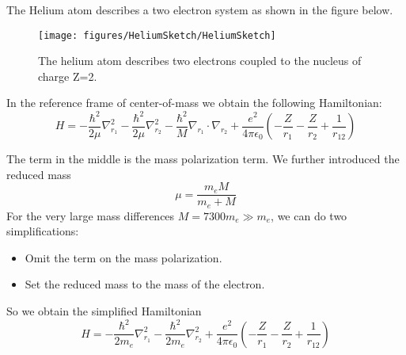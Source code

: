 \documentclass[10pt]{article}
\begin{document}
The Helium atom describes a two electron system as shown in the figure below.
\begin{figure}[h!]
\begin{center}
\texttt{[image: figures/HeliumSketch/HeliumSketch]}
\caption{{The helium atom describes two electrons coupled to the nucleus of charge
Z=2.~~
{\label{982117}}%
}}
\end{center}
\end{figure}



In the reference frame of center-of-mass we obtain the following Hamiltonian:
\begin{equation}
H = -\frac{\hbar^2}{2\mu}\nabla_{r_1}^2 -\frac{\hbar^2}{2\mu}\nabla_{r_2}^2-\frac{\hbar^2}{M}\nabla_{r_1}\cdot\nabla_{r_2}+\frac{e^2}{4\pi \epsilon_0}\left(-\frac{Z}{r_1}-\frac{Z}{r_2}+\frac{1}{r_{12}}\right)
\end{equation}

The term in the middle is the mass polarization term. We further introduced the reduced mass
\begin{equation}
\mu = \frac{m_eM}{m_e + M}
\end{equation}
For the very large mass differences $M= 7300 m_e \gg m_e$, we can do two simplifications:
\begin{itemize}
\item Omit the term on the mass polarization.
\item Set the reduced mass to the mass of the electron.
\end{itemize}

So we obtain the simplified Hamiltonian
\begin{equation}
H = -\frac{\hbar^2}{2m_e}\nabla_{r_1}^2 -\frac{\hbar^2}{2m_e}\nabla_{r_2}^2+\frac{e^2}{4\pi \epsilon_0}\left(-\frac{Z}{r_1}-\frac{Z}{r_2}+\frac{1}{r_{12}}\right)
\end{equation}
\end{document}
